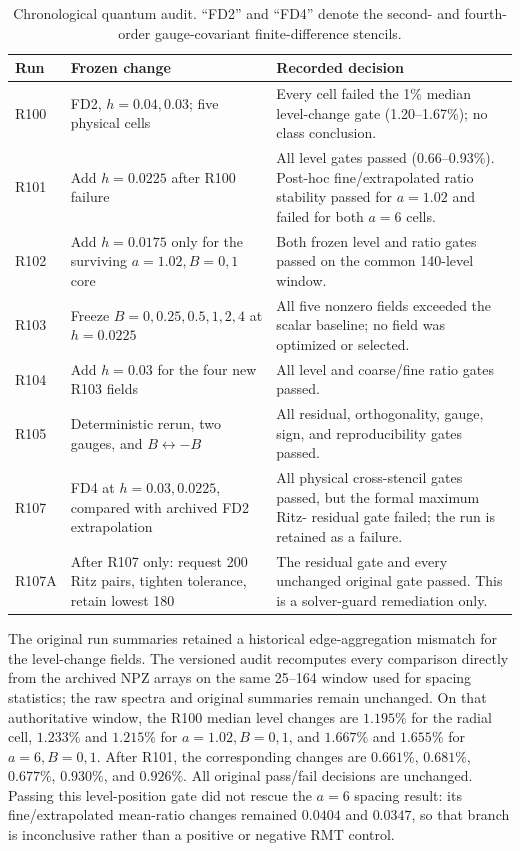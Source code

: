 \begin{table}[p]
 \centering
 \caption{Chronological quantum audit.  ``FD2'' and ``FD4'' denote the
 second- and fourth-order gauge-covariant finite-difference stencils.}
 \label{tab:quantum-protocol-chain}
 \small
 \begin{tabular}{@{}p{}p{}p{}@{}}
 \toprule
 Run & Frozen change & Recorded decision \\
 \midrule
 R100 & FD2, \(h=0.04,0.03\); five physical cells & Every cell failed the
 1\% median level-change gate (1.20--1.67\%); no class conclusion. \\
 R101 & Add \(h=0.0225\) after R100 failure & All level gates passed
 (0.66--0.93\%).  Post-hoc fine/extrapolated ratio stability passed for
 \(a=1.02\) and failed for both \(a=6\) cells. \\
 R102 & Add \(h=0.0175\) only for the surviving \(a=1.02,B=0,1\) core &
 Both frozen level and ratio gates passed on the common 140-level window. \\
 R103 & Freeze \(B=0,0.25,0.5,1,2,4\) at \(h=0.0225\) & All five nonzero
 fields exceeded the scalar baseline; no field was optimized or selected. \\
 R104 & Add \(h=0.03\) for the four new R103 fields & All level and
 coarse/fine ratio gates passed. \\
 R105 & Deterministic rerun, two gauges, and \(B\leftrightarrow-B\) & All
 residual, orthogonality, gauge, sign, and reproducibility gates passed. \\
 R107 & FD4 at \(h=0.03,0.0225\), compared with archived FD2 extrapolation &
 All physical cross-stencil gates passed, but the formal maximum Ritz-
 residual gate failed; the run is retained as a failure. \\
 R107A & After R107 only: request 200 Ritz pairs, tighten tolerance, retain
 lowest 180 & The residual gate and every unchanged original gate passed.
 This is a solver-guard remediation only. \\
 \bottomrule
 \end{tabular}
\end{table}

The original run summaries retained a historical edge-aggregation mismatch
for the level-change fields.  The versioned audit
 recomputes every comparison directly
from the archived NPZ arrays on the same 25--164 window used for spacing
statistics; the raw spectra and original summaries remain unchanged.  On
that authoritative window, the R100 median level changes are \(1.195\%\)
for the radial cell, \(1.233\%\) and \(1.215\%\) for \(a=1.02,B=0,1\),
and \(1.667\%\) and \(1.655\%\) for \(a=6,B=0,1\).  After R101, the
corresponding changes are \(0.661\%\), \(0.681\%\), \(0.677\%\),
\(0.930\%\), and \(0.926\%\).  All original pass/fail decisions are
unchanged.  Passing this level-position gate did not
rescue the \(a=6\) spacing result: its fine/extrapolated mean-ratio changes
remained \(0.0404\) and \(0.0347\), so that branch is inconclusive rather
than a positive or negative RMT control.

